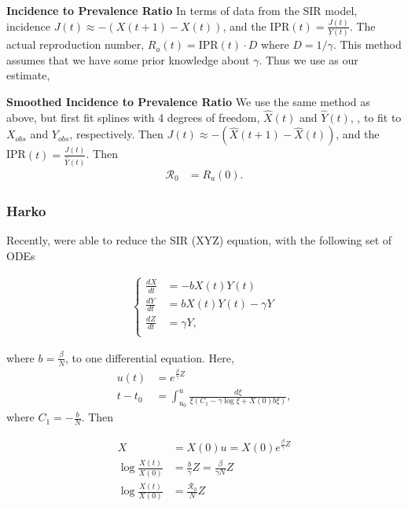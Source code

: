 \documentclass[12pt]{article}
\newcommand{\rr}{\ensuremath{\mathcal{R}_0}}
\begin{document}
\textbf{Incidence to Prevalence
Ratio}\label{incidence-to-prevalence-ratio}
In terms of data from the SIR model, incidence $J(t) \approx -(X(t+1) - X(t))$, and the IPR$(t) = \frac{J(t)}{Y(t)}$. The actual reproduction number, $R_a(t) = \text{IPR}(t)\cdot D$ where $D = 1 /\gamma$.  This method assumes that we have some prior knowledge about $\gamma$.  Thus we use as our estimate,

\textbf{Smoothed Incidence to Prevalence Ratio}
We use the same method as above, but first fit splines with 4 degrees of freedom, $\hat{X}(t)$ and $\hat{Y}(t)$, , to fit to $X_{obs}$ and $Y_{obs}$, respectively.  Then  $J(t) \approx -(\hat{X}(t+1) - \hat{X}(t))$, and the IPR$(t) = \frac{J(t)}{\hat{Y}(t)}$.  Then
\begin{align*}
\rr &= R_a(0).
\end{align*}



\subsubsection{Harko}
Recently, \citep{harko2014exact} were able to reduce the SIR (XYZ) equation, with the following set of ODEs

\begin{align*}
  \left \{ \begin{array}{ll}
             \frac{dX}{dt} &= - b X(t) Y(t) \\
             \frac{dY}{dt} &=  b X(t) Y(t) - \gamma Y\\
             \frac{dZ}{dt} &= \gamma Y,\\
           \end{array}
  \right .
\end{align*}

where $b = \frac{\beta}{N}$, to one differential equation.  Here,
\begin{align*}
  u(t) &= e^{\frac{\beta}{\gamma}Z} \\
  t - t_0 &= \int_{u_0}^u \frac{d \xi}{\xi (C_1 - \gamma \log \xi + X(0) b \xi)},
\end{align*}
where $C_1 = -\frac{b}{N}$.  Then

\begin{align}
  X &= X(0) u  = X(0) e^{\frac{\beta}{\gamma}Z} \nonumber\\
  \log \frac{X(t)}{X(0)} &=  \frac{b}{\gamma}Z =  \frac{\beta}{\gamma N} Z \nonumber\\
  \log \frac{X(t)}{X(0)} &=  \frac{\rr}{N} Z \label{eq:harko_lin}
\end{align}
\end{document}
